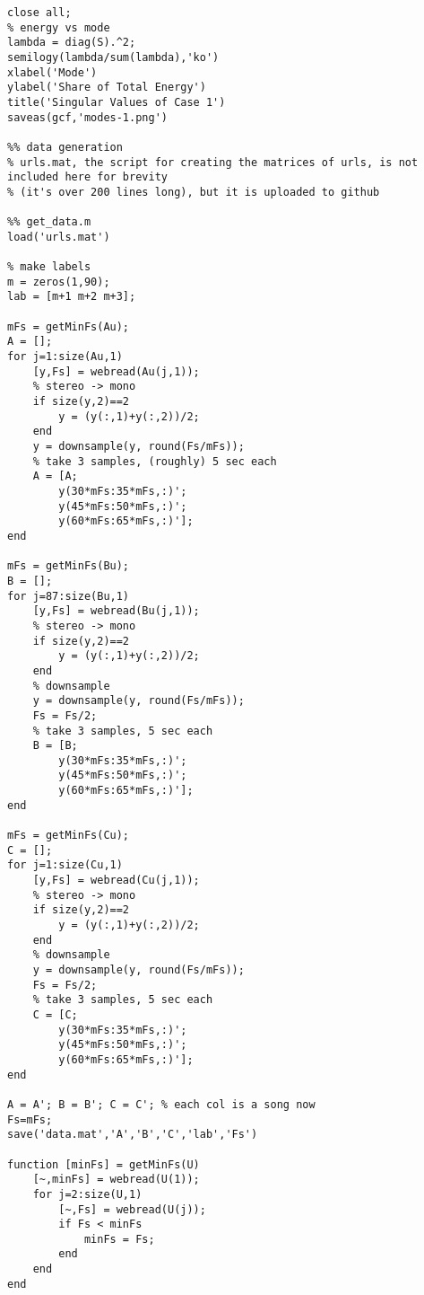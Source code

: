 \documentclass[a4paper,10 pt]{article}
\begin{document}
\begin{lstlisting}
close all;
% energy vs mode
lambda = diag(S).^2;
semilogy(lambda/sum(lambda),'ko')
xlabel('Mode')
ylabel('Share of Total Energy')
title('Singular Values of Case 1')
saveas(gcf,'modes-1.png')

%% data generation
% urls.mat, the script for creating the matrices of urls, is not included here for brevity 
% (it's over 200 lines long), but it is uploaded to github

%% get_data.m
load('urls.mat')

% make labels
m = zeros(1,90);
lab = [m+1 m+2 m+3];

mFs = getMinFs(Au);
A = [];
for j=1:size(Au,1) 
    [y,Fs] = webread(Au(j,1));
    % stereo -> mono
    if size(y,2)==2
        y = (y(:,1)+y(:,2))/2;
    end
    y = downsample(y, round(Fs/mFs));
    % take 3 samples, (roughly) 5 sec each
    A = [A; 
        y(30*mFs:35*mFs,:)';
        y(45*mFs:50*mFs,:)';
        y(60*mFs:65*mFs,:)'];
end

mFs = getMinFs(Bu);
B = [];
for j=87:size(Bu,1) 
    [y,Fs] = webread(Bu(j,1));
    % stereo -> mono
    if size(y,2)==2
        y = (y(:,1)+y(:,2))/2;
    end
    % downsample
    y = downsample(y, round(Fs/mFs));
    Fs = Fs/2;
    % take 3 samples, 5 sec each
    B = [B; 
        y(30*mFs:35*mFs,:)';
        y(45*mFs:50*mFs,:)';
        y(60*mFs:65*mFs,:)'];
end

mFs = getMinFs(Cu);
C = [];
for j=1:size(Cu,1) 
    [y,Fs] = webread(Cu(j,1));
    % stereo -> mono
    if size(y,2)==2
        y = (y(:,1)+y(:,2))/2;
    end
    % downsample
    y = downsample(y, round(Fs/mFs));
    Fs = Fs/2;
    % take 3 samples, 5 sec each
    C = [C; 
        y(30*mFs:35*mFs,:)';
        y(45*mFs:50*mFs,:)';
        y(60*mFs:65*mFs,:)'];
end

A = A'; B = B'; C = C'; % each col is a song now
Fs=mFs;
save('data.mat','A','B','C','lab','Fs')

function [minFs] = getMinFs(U)
    [~,minFs] = webread(U(1));
    for j=2:size(U,1)
        [~,Fs] = webread(U(j));
        if Fs < minFs
            minFs = Fs;
        end
    end
end

\end{lstlisting}
\end{document}
